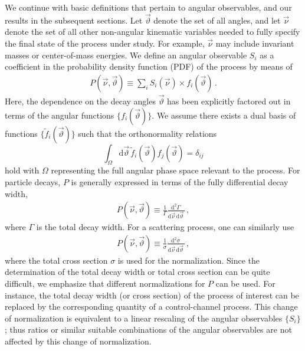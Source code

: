 \documentclass[aps,prd,reprint,nofootinbib,preprintnumbers]{revtex4}
\newcommand{\dual}[1]{\tilde{#1}}
\newcommand{\nuvec}{\vec{\nu}}
\newcommand{\rmdx}[1]{\mbox{d} #1 \,} %
\newcommand{\thvec}{\vec{\vartheta}}
\renewcommand{\theta}{\vartheta}
\begin{document}
We continue with basic definitions that pertain to angular observables, and our
results in the subsequent sections. Let $\thvec$ denote the set of all
angles, and let $\nuvec$ denote the set of all
other non-angular kinematic variables needed to fully specify the
final state of the process under study. For example, $\nuvec$ may
include invariant masses or center-of-mass energies. We define an
angular observable $S_i$ as a coefficient in the probability density
function (PDF) of the process by means of
\begin{align}
    \label{eq:def-P}
    P(\nuvec, \thvec) \equiv \sum_i S_i(\nuvec) \times f_i(\thvec)\,.
\end{align}
Here, the dependence on the decay angles $\thvec$ has been
explicitly factored out in terms of the angular functions
$\{f_i(\thvec)\}$. We assume there exists a dual basis of functions
$\{\dual{f}_i(\thvec)\}$ such that the orthonormality relations
\begin{equation}
    \label{eq:def-ortho-rel}
    \int_\Omega \rmdx{\vec{\theta}} \dual{f}_i(\thvec) f_j(\thvec)  = \delta_{ij}
\end{equation}
hold with $\Omega$ representing the full angular phase space relevant
to the process.  For particle decays, $P$ is generally expressed in
terms of the fully differential decay width,
\begin{align}
    \label{eq:def-P-decay}
    P(\nuvec, \thvec) \equiv \frac{1}{\Gamma}\frac{\rmdx{^{2}\Gamma}}{\rmdx{\vec\nu} \rmdx{\vec\theta}}\,,
\end{align}
where $\Gamma$ is the total decay width. For a scattering process, one can similarly use
\begin{align}
    \label{eq:def-P-scattering}
    P(\nuvec, \thvec) \equiv \frac{1}{\sigma}\frac{\rmdx{^{2}\sigma}}{\rmdx{\vec\nu} \rmdx{\vec\theta}}\,,
\end{align}
where the total cross section $\sigma$ is used for the
normalization. Since the determination of the total decay width or
total cross section can be quite difficult, we emphasize that
different normalizations for $P$ can be used.  For instance, the total
decay width (or cross section) of the process of interest can be
replaced by the corresponding quantity of a control-channel
process. This change of normalization is equivalent to a linear rescaling of
the angular observables $\lbrace S_i\rbrace$; thus ratios or similar suitable combinations
of the angular observables are not affected by this change of normalization.\\
\end{document}
